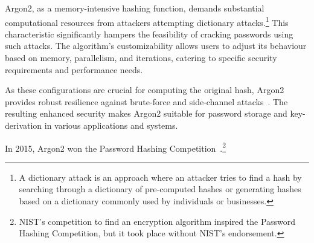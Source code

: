 Argon2, as a memory-intensive hashing function, demands substantial
computational resources from attackers attempting dictionary attacks.\footnote{
  A dictionary attack is an approach where an attacker tries to find a hash by
  searching through a dictionary of pre-computed hashes or generating hashes
  based on a dictionary commonly used by individuals or businesses.
}
This characteristic significantly hampers the feasibility of cracking passwords
using such attacks.
The algorithm's customizability allows users to adjust its behaviour based on
memory, parallelism, and iterations, catering to specific security requirements
and performance needs.

As these configurations are crucial for computing the original hash, Argon2
provides robust resilience against brute-force and side-channel attacks~\cite{
  argon2specs}.
The resulting enhanced security makes Argon2 suitable for password storage and
key-derivation in various applications and systems.

In 2015, Argon2 won the Password Hashing Competition~\cite{passwordhashing}.\footnote{
  NIST's competition to find an encryption algorithm inspired the Password
  Hashing Competition, but it took place without NIST's endorsement.
}
